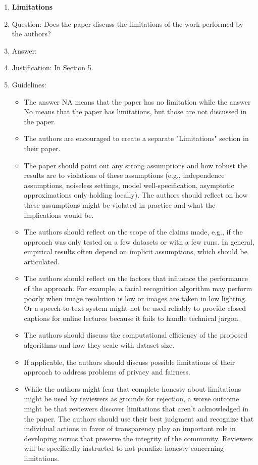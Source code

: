 \documentclass{article}
\begin{document}
\begin{enumerate}
\item {\bf Limitations}
    \item[] Question: Does the paper discuss the limitations of the work performed by the authors?
    \item[] Answer: \answerYes{} %
    \item[] Justification: In Section 5.
    \item[] Guidelines:
    \begin{itemize}
        \item The answer NA means that the paper has no limitation while the answer No means that the paper has limitations, but those are not discussed in the paper. 
        \item The authors are encouraged to create a separate "Limitations" section in their paper.
        \item The paper should point out any strong assumptions and how robust the results are to violations of these assumptions (e.g., independence assumptions, noiseless settings, model well-specification, asymptotic approximations only holding locally). The authors should reflect on how these assumptions might be violated in practice and what the implications would be.
        \item The authors should reflect on the scope of the claims made, e.g., if the approach was only tested on a few datasets or with a few runs. In general, empirical results often depend on implicit assumptions, which should be articulated.
        \item The authors should reflect on the factors that influence the performance of the approach. For example, a facial recognition algorithm may perform poorly when image resolution is low or images are taken in low lighting. Or a speech-to-text system might not be used reliably to provide closed captions for online lectures because it fails to handle technical jargon.
        \item The authors should discuss the computational efficiency of the proposed algorithms and how they scale with dataset size.
        \item If applicable, the authors should discuss possible limitations of their approach to address problems of privacy and fairness.
        \item While the authors might fear that complete honesty about limitations might be used by reviewers as grounds for rejection, a worse outcome might be that reviewers discover limitations that aren't acknowledged in the paper. The authors should use their best judgment and recognize that individual actions in favor of transparency play an important role in developing norms that preserve the integrity of the community. Reviewers will be specifically instructed to not penalize honesty concerning limitations.
    \end{itemize}


\end{enumerate}
\end{document}
